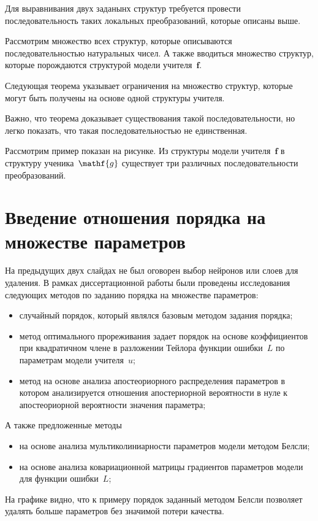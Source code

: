 \documentclass[10pt, twoside]{article}
\begin{document}
Для выравнивания двух заданынх структур требуется провести последовательность таких локальных преобразований, которые описаны выше.

Рассмотрим множество всех структур, которые описываются последовательностью натуральных чисел. А также вводиться множество структур, которые порождаются структурой модели учителя~$\mathbf{f}$.

Следующая теорема указывает ограничения на множество структур, которые могут быть получены на основе одной структуры учителя.

Важно, что теорема доказывает существования такой последовательности, но легко показать, что такая последовательностью не единственная.

Рассмотрим пример показан на рисунке. Из структуры модели учителя~$\mathbf{f}$ в структуру ученика~$\mathf{g}$ существует три различных последовательности преобразований.

\section{Введение отношения порядка на множестве параметров}
На предыдущих двух слайдах не был оговорен выбор нейронов или слоев для удаления. В рамках диссертационной работы были проведены исследования следующих методов по заданию порядка на множестве параметров:
\begin{itemize}
    \item случайный порядок, который являлся базовым методом задания порядка;
    \item метод оптимального прореживания задает порядок на основе коэффициентов при квадратичном члене в разложении Тейлора функции ошибки~$L$ по параметрам модели учителя~$u$;
    \item метод на основе анализа апостеориорного распределения параметров в котором анализируется отношения апостериорной вероятности в нуле к апостеориорной вероятности значения параметра;
\end{itemize}
А также предложенные методы
\begin{itemize}
    \item на основе анализа мультиколиниарности параметров модели методом Белсли;
    \item на основе анализа ковариационной матрицы градиентов параметров модели для функции ошибки~$L$;
\end{itemize}

На графике видно, что к примеру порядок заданный методом Белсли позволяет удалять больше параметров без значимой потери качества.
\end{document}

